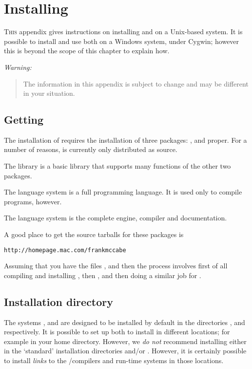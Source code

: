 \chapter{Installing \go}
\label{install}

\lettrine[nindent=0.1em]{T}{his} appendix gives instructions on installing \go and \april on a Unix-based system. It is possible to install and use both on a Windows system, under Cygwin; however this is beyond the scope of this chapter to explain how.

\emph{Warning:}
\begin{quote}
The information in this appendix is subject to change and may be different in your situation.
\end{quote}

\section{Getting \go}
The installation of \go requires the installation of three packages: , \april and \go proper. For a number of reasons, \go is currently only distributed as source.

The  library is a basic library that supports many functions of the other two packages.

The \april language system is a full programming language. It is used only to compile \go programs, however.

The \go language system is the complete engine, compiler and documentation.

A good place to get the source tarballs for these packages is
\begin{alltt}
http://homepage.mac.com/frankmccabe
\end{alltt}

Assuming that you have the files ,  and  then the process involves first of all compiling and installing , then \april, and then doing a similar job for \go.

\section{Installation directory}
The systems , \april and \go are designed to be installed by default in the directories ,  and  respectively. It is possible to set up both to install in different locations; for example in your home directory. However, we \emph{do not} recommend installing either in the `standard' installation directories  and/or . However, it is certainly possible to install \emph{links} to the \april/\go compilers and run-time systems in those locations.

